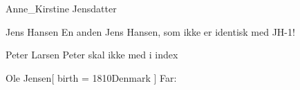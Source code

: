 \documentclass[
	twocolumn
]{article}
\begin{document}
\begin{gprProfile}{Anne_Kirstine Jensdatter}
	\gprGivenName

\end{gprProfile}

\begin{gprProfile}{Jens Hansen}
	En anden Jens Hansen, som ikke er identisk med JH-1!
\end{gprProfile}

\begin{gprProfile}[no index]{Peter Larsen}
	Peter skal ikke med i index
\end{gprProfile}



\begin{gprProfile}{Ole Jensen}[
	birth = {1810}{Denmark}
]
	Far:
\end{gprProfile}

\printindex[gpr-id]
\end{document}
